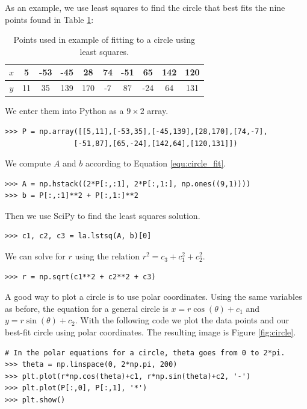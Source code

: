 As an example, we use least squares to find the circle that best fits the nine points found in Table \ref{table:circlepts}:
\begin{table}
\begin{tabular}{c||c|c|c|c|c|c|c|c|c}
$x$& 5  &-53 & -45 &  28 & 74 & -51 &  65 & 142 & 120 \\ \hline
$y$& 11 & 35 & 139 & 170 & -7 &  87 & -24 &  64 & 131 \\
\end{tabular}
\caption{Points used in example of fitting to a circle using least squares.}
\label{table:circlepts}
\end{table}

We enter them into Python as a $9\times 2$ array.

\begin{lstlisting}
>>> P = np.array([[5,11],[-53,35],[-45,139],[28,170],[74,-7],
                [-51,87],[65,-24],[142,64],[120,131]])
\end{lstlisting}

We compute $A$ and $b$ according to Equation \ref{equ:circle_fit}.

\begin{lstlisting}
>>> A = np.hstack((2*P[:,:1], 2*P[:,1:], np.ones((9,1))))
>>> b = P[:,:1]**2 + P[:,1:]**2
\end{lstlisting}

Then we use SciPy to find the least squares solution.

\begin{lstlisting}
>>> c1, c2, c3 = la.lstsq(A, b)[0]
\end{lstlisting}

We can solve for $r$ using the relation $r^2 = c_3+c_1^2+c_2^2$.

\begin{lstlisting}
>>> r = np.sqrt(c1**2 + c2**2 + c3)
\end{lstlisting}

A good way to plot a circle is to use polar coordinates.
Using the same variables as before, the equation for a general circle is $x=r\cos(\theta)+c_1$ and $y=r\sin(\theta)+c_2$.
With the following code we plot the data points and our best-fit circle using polar coordinates.
The resulting image is Figure \ref{fig:circle}.

\begin{lstlisting}
# In the polar equations for a circle, theta goes from 0 to 2*pi.
>>> theta = np.linspace(0, 2*np.pi, 200)
>>> plt.plot(r*np.cos(theta)+c1, r*np.sin(theta)+c2, '-')
>>> plt.plot(P[:,0], P[:,1], '*')
>>> plt.show()
\end{lstlisting}

